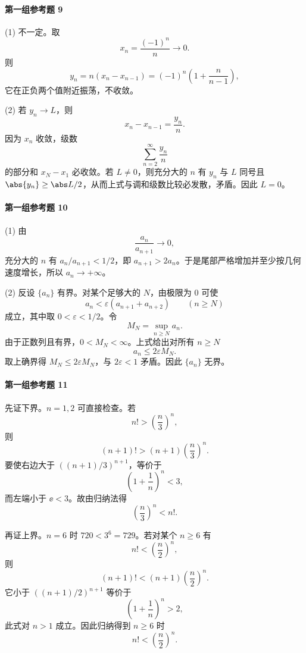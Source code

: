 \paragraph{第一组参考题 9}
\begin{xsolution}
(1) 不一定。取
\[
  x_n=\frac{(-1)^n}{n}\to0.
\]
则
\[
  y_n=n(x_n-x_{n-1})
  =(-1)^n\left(1+\frac n{n-1}\right),
\]
它在正负两个值附近振荡，不收敛。

(2) 若 $y_n\to L$，则
\[
  x_n-x_{n-1}=\frac{y_n}{n}.
\]
因为 $x_n$ 收敛，级数
\[
  \sum_{n=2}^{\infty}\frac{y_n}{n}
\]
的部分和 $x_N-x_1$ 必收敛。若 $L\ne0$，则充分大的 $n$ 有 $y_n$ 与 $L$ 同号且 $\abs{y_n}\ge\abs L/2$，从而上式与调和级数比较必发散，矛盾。因此 $L=0$。
\end{xsolution}

\paragraph{第一组参考题 10}
\begin{xsolution}
(1) 由
\[
  \frac{a_n}{a_{n+1}}\to0,
\]
充分大的 $n$ 有 $a_n/a_{n+1}<1/2$，即 $a_{n+1}>2a_n$。于是尾部严格增加并至少按几何速度增长，所以 $a_n\to+\infty$。

(2) 反设 $\{a_n\}$ 有界。对某个足够大的 $N$，由极限为 $0$ 可使
\[
  a_n<\varepsilon(a_{n+1}+a_{n+2})
  \qquad(n\ge N)
\]
成立，其中取 $0<\varepsilon<1/2$。令
\[
  M_N=\sup_{n\ge N}a_n.
\]
由于正数列且有界，$0<M_N<\infty$。上式给出对所有 $n\ge N$
\[
  a_n\le2\varepsilon M_N.
\]
取上确界得 $M_N\le2\varepsilon M_N$，与 $2\varepsilon<1$ 矛盾。因此 $\{a_n\}$ 无界。
\end{xsolution}

\paragraph{第一组参考题 11}
\begin{xsolution}
先证下界。$n=1,2$ 可直接检查。若
\[
  n!>\left(\frac n3\right)^n,
\]
则
\[
  (n+1)!>(n+1)\left(\frac n3\right)^n.
\]
要使右边大于 $((n+1)/3)^{n+1}$，等价于
\[
  \left(1+\frac1n\right)^n<3,
\]
而左端小于 $\ee<3$。故由归纳法得
\[
  \left(\frac n3\right)^n<n!.
\]

再证上界。$n=6$ 时 $720<3^6=729$。若对某个 $n\ge6$ 有
\[
  n!<\left(\frac n2\right)^n,
\]
则
\[
  (n+1)!<(n+1)\left(\frac n2\right)^n.
\]
它小于 $((n+1)/2)^{n+1}$ 等价于
\[
  \left(1+\frac1n\right)^n>2,
\]
此式对 $n>1$ 成立。因此归纳得到 $n\ge6$ 时
\[
  n!<\left(\frac n2\right)^n.
\]
\end{xsolution}

